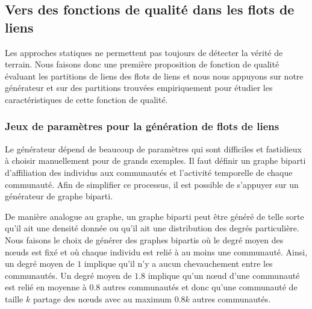 
\subsection{Vers des fonctions de qualité dans les flots de liens}
\label{sec:versqualite_qualite}

Les approches statiques ne permettent pas toujours de détecter la vérité de terrain.
Nous faisons donc une première proposition de fonction de qualité évaluant les partitions de liens des flots de liens et nous nous appuyons sur notre générateur et sur des partitions trouvées empiriquement pour étudier les caractéristiques de cette fonction de qualité.





\subsubsection{Jeux de paramètres pour la génération de flots de liens}
\label{subsec:versqualite_qualite_param}
Le générateur dépend de beaucoup de paramètres qui sont difficiles et fastidieux à choisir manuellement pour de grands exemples.
Il faut définir un graphe biparti d'affiliation des individus aux communautés et l'activité temporelle de chaque communauté.
Afin de simplifier ce processus, il est possible de s'appuyer sur un générateur de graphe biparti.

De manière analogue au graphe, un graphe biparti peut être généré de telle sorte qu'il ait une densité donnée ou qu'il ait une distribution des degrés particulière.
Nous faisons le choix de générer des graphes bipartis où le degré moyen des n\oe{}uds est fixé et où chaque individu est relié à au moins une communauté.
Ainsi, un degré moyen de $1$ implique qu'il n'y a aucun chevauchement entre les communautés.
Un degré moyen de $1.8$ implique qu'un n\oe{}ud d'une communauté est relié en moyenne à $0.8$ autres communautés et donc qu'une communauté de taille $k$ partage des n\oe{}uds avec au maximum $0.8k$ autres communautés.

